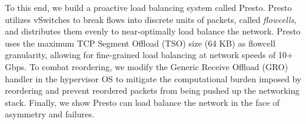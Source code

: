 %
%
%

To this end, we build a proactive load balancing system called Presto.
Presto utilizes vSwitches to break flows into discrete units of packets, called 
{\em flowcells}, and distributes them evenly 
to near-optimally load balance the network. 
Presto uses the maximum TCP Segment Offload (TSO) size (64 KB) as flowcell granularity, 
allowing for fine-grained load balancing at network speeds of 10+ Gbps.  
To combat reordering, we modify the Generic Receive Offload (GRO) handler
in the hypervisor OS to mitigate the computational burden imposed by reordering
and prevent reordered packets from being pushed up the networking stack.
Finally, we show Presto can load balance the network
in the face of asymmetry and failures.


